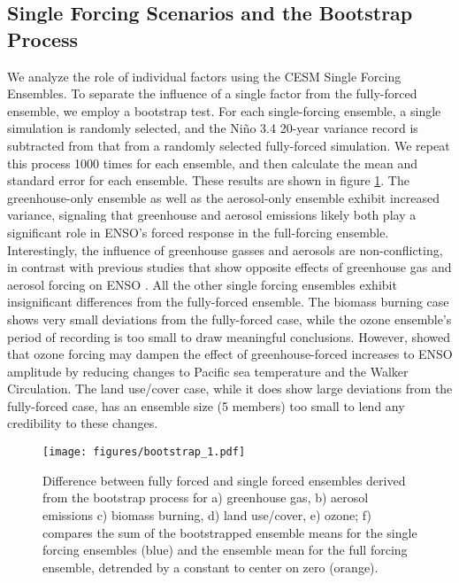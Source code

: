 \documentclass[draft]{agujournal2019}
\begin{document}
\subsection{Single Forcing Scenarios and the Bootstrap Process}
We analyze the role of individual factors using the CESM Single Forcing Ensembles. To separate the influence of a single factor from the fully-forced ensemble, we employ a bootstrap test. For each single-forcing ensemble, a single simulation is randomly selected, and the Ni\~{n}o 3.4 20-year variance record is subtracted from that from a randomly selected fully-forced simulation. We repeat this process 1000 times for each ensemble, and then calculate the mean and standard error for each ensemble. These results are shown in figure \ref{fig:bootstrap_1}. The greenhouse-only ensemble as well as the aerosol-only ensemble exhibit increased variance, signaling that greenhouse and aerosol emissions likely both play a significant role in ENSO's forced response in the full-forcing ensemble. Interestingly, the influence of greenhouse gasses and aerosols are non-conflicting, in contrast with previous studies that show opposite effects of greenhouse gas and aerosol forcing on ENSO \cite{stevenson2019forced}. All the other single forcing ensembles exhibit insignificant differences from the fully-forced ensemble. The biomass burning case shows very small deviations from the fully-forced case, while the ozone ensemble's period of recording is too small to draw meaningful conclusions. However,  showed that ozone forcing may dampen the effect of greenhouse-forced increases to ENSO amplitude by reducing changes to Pacific sea temperature and the Walker Circulation. The land use/cover case, while it does show large deviations from the fully-forced case, has an ensemble size (5 members) too small to lend any credibility to these changes.

\begin{figure}
    \texttt{[image: figures/bootstrap\_1.pdf]}
    \caption{Difference between fully forced and single forced ensembles derived from the bootstrap process for a) greenhouse gas, b) aerosol emissions c) biomass burning, d) land use/cover, e) ozone; f) compares the sum of the bootstrapped ensemble means for the single forcing ensembles (blue) and the ensemble mean for the full forcing ensemble, detrended by a constant to center on zero (orange).}
    \label{fig:bootstrap_1}
\end{figure}
\end{document}
